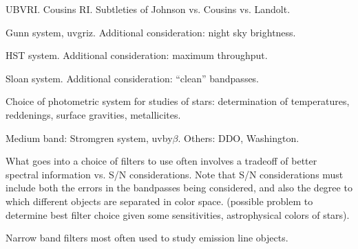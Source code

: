 \documentclass[12pt]{article}
\begin{document}
UBVRI. Cousins RI. Subtleties of Johnson vs. Cousins vs. Landolt.

Gunn system, uvgriz. Additional consideration: night sky brightness.

HST system. Additional consideration: maximum throughput.

Sloan system. Additional consideration: ``clean'' bandpasses.

Choice of photometric system for studies of stars: determination of
temperatures, reddenings, surface gravities, metallicites.

Medium band: Stromgren system, uvby$ \beta$. Others: DDO, Washington.

What goes into a choice of filters to use often involves a tradeoff of
better spectral information vs. S/N considerations. Note that S/N
considerations must include both the errors in the bandpasses being
considered, and also the degree to which different objects are
separated in color space. (possible problem to determine best filter
choice given some sensitivities, astrophysical colors of stars).

Narrow band filters most often used to study emission line objects.
\end{document}
